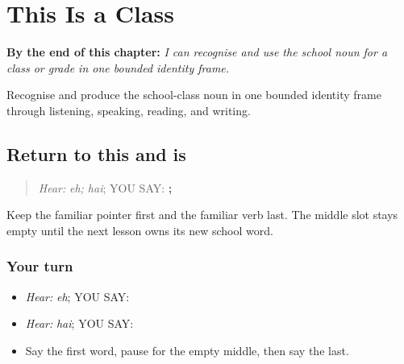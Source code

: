 
\chapter{This Is a Class}
\label{ch:pa-a2-class}

\begin{chapteropening}
\textbf{By the end of this chapter:} \emph{I can recognise and use the school noun for a class or grade in one bounded identity frame.}

Recognise and produce the school-class noun in one bounded identity frame through listening, speaking, reading, and writing.
\end{chapteropening}

\section[\texorpdfstring{\pa{ਇਹ} · \pa{ਹੈ} (eh; hai)}{ਇਹ · ਹੈ (eh; hai)}]{Return to this and is}

\label{lesson:PA-C201-identity-return}



\begin{quote}
\emph{Hear:} \emph{eh; hai}; YOU SAY: \textbf{; }
\end{quote}

\begin{grammarlens}[title={Grammar Lens}]
Keep the familiar pointer first and the familiar verb last. The middle slot stays empty until the next lesson owns its new school word.
\end{grammarlens}

\subsection*{Your turn}
\begin{itemize}
\raggedright
  \item \emph{Hear:} \emph{eh}; YOU SAY: \textbf{}
  \item \emph{Hear:} \emph{hai}; YOU SAY: \textbf{}
  \item Say the first word, pause for the empty middle, then say the last.
\end{itemize}

